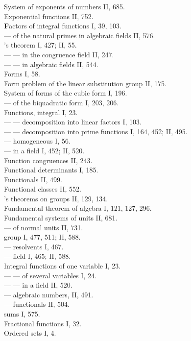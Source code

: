 \noindent
System of exponents of numbers II, 685.\\
Exponential functions II, 752.\\

\medskip
\noindent
\textbf{F}actors of integral functions I, 39, 103.\\
--- of the natural primes in algebraic fields II, 576.\\
's theorem I, 427; II, 55.\\
--- --- in the congruence field II, 247.\\
--- --- in algebraic fields II, 544.\\
Forms I, 58.\\
Form problem of the linear substitution group II, 175.\\
System of forms of the cubic form I, 196.\\
--- of the biquadratic form I, 203, 206.\\
Functions, integral I, 23.\\
--- --- decomposition into linear factors I, 103.\\
--- --- decomposition into prime functions I, 164, 452; II, 495.\\
--- homogeneous I, 56.\\
--- in a field I, 452; II, 520.\\
Function congruences II, 243.\\
Functional determinants I, 185.\\
Functionals II, 499.\\
Functional classes II, 552.\\
's theorems on groups II, 129, 134.\\
Fundamental theorem of algebra I, 121, 127, 296.\\
Fundamental systems of units II, 681.\\
--- of normal units II, 731.\\

\medskip
\noindent
{} group I, 477, 511; II, 588.\\
--- resolvents I, 467.\\
--- field I, 465; II, 588.\\
Integral functions of one variable I, 23.\\
--- --- of several variables I, 24.\\
--- --- in a field II, 520.\\
--- algebraic numbers, II, 491.\\ %
--- functionals II, 504.\\
 sums I, 575.\\
Fractional functions I, 32.\\
Ordered sets I, 4.\\

